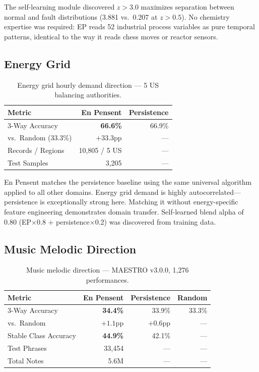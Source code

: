 \documentclass[12pt,a4paper]{article}
\begin{document}
The self-learning module discovered $z{>}3.0$ maximizes separation between normal and fault
distributions (3.881 vs.\ 0.207 at $z{>}0.5$). No chemistry expertise was required: EP reads
52 industrial process variables as pure temporal patterns, identical to the way it reads chess
moves or reactor sensors.

\subsection{Energy Grid}

\begin{table}[H]
\centering
\caption{Energy grid hourly demand direction --- 5 US balancing authorities.}
\label{tab:energy}
\begin{tabular}{lrr}
\toprule
\textbf{Metric} & \textbf{En Pensent} & \textbf{Persistence} \\
\midrule
3-Way Accuracy & \textbf{66.6\%} & 66.9\% \\
vs.\ Random (33.3\%) & $+33.3$pp & --- \\
Records / Regions & 10,805 / 5 US & --- \\
Test Samples & 3,205 & --- \\
\bottomrule
\end{tabular}
\end{table}

En Pensent matches the persistence baseline using the same universal algorithm applied to all other
domains. Energy grid demand is highly autocorrelated---persistence is exceptionally strong here.
Matching it without energy-specific feature engineering demonstrates domain transfer. Self-learned
blend alpha of 0.80 (EP$\times$0.8 $+$ persistence$\times$0.2) was discovered from training data.

\subsection{Music Melodic Direction}

\begin{table}[H]
\centering
\caption{Music melodic direction --- MAESTRO v3.0.0, 1,276 performances.}
\label{tab:music}
\begin{tabular}{lrrr}
\toprule
\textbf{Metric} & \textbf{En Pensent} & \textbf{Persistence} & \textbf{Random} \\
\midrule
3-Way Accuracy & \textbf{34.4\%} & 33.9\% & 33.3\% \\
vs.\ Random & $+1.1$pp & $+0.6$pp & --- \\
Stable Class Accuracy & \textbf{44.9\%} & 42.1\% & --- \\
Test Phrases & 33,454 & --- & --- \\
Total Notes & 5.6M & --- & --- \\
\bottomrule
\end{tabular}
\end{table}
\end{document}
